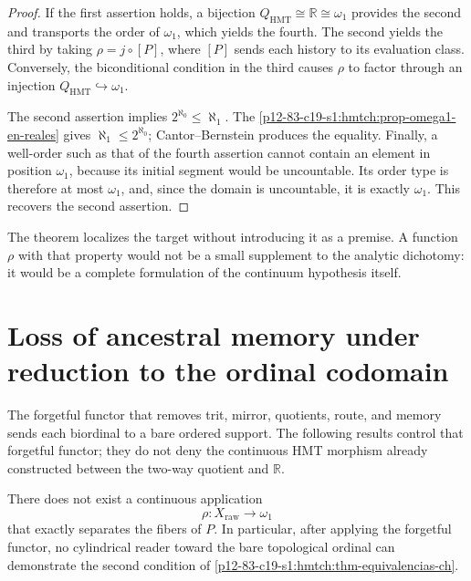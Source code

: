 \begin{proof}
If the first assertion holds, a bijection \(Q_{\mathrm{HMT}}\cong\mathbb R\cong\omega_1\) provides the second and transports the order of \(\omega_1\), which yields the fourth. The second yields the third by taking \(\rho=j\circ[P]\), where \([P]\) sends each history to its evaluation class. Conversely, the biconditional condition in the third causes \(\rho\) to factor through an injection \(Q_{\mathrm{HMT}}\hookrightarrow\omega_1\).

The second assertion implies
\(2^{\aleph_0}\leq\aleph_1\). The
\cref{p12-83-c19-s1:hmtch:prop-omega1-en-reales} gives
\(\aleph_1\leq2^{\aleph_0}\); Cantor--Bernstein produces the equality. Finally,
a well-order such as that of the fourth assertion cannot contain an
element in position \(\omega_1\), because its initial segment would be uncountable.
Its order type is therefore at most \(\omega_1\), and, since
the domain is uncountable, it is exactly \(\omega_1\). This recovers the
second assertion.
\end{proof}

The theorem localizes the target without introducing it as a premise. A function
\(\rho\) with that property would not be a small supplement to the analytic
dichotomy: it would be a complete formulation of the continuum
hypothesis itself.

\section{Loss of ancestral memory under reduction to the ordinal codomain}

The forgetful functor that removes trit, mirror, quotients, route, and memory sends
each biordinal to a bare ordered support. The following results
control that forgetful functor; they do not deny the continuous HMT morphism already
constructed between the two-way quotient and \(\mathbb R\).

\begin{theorem}
\label{p12-83-c19-s1:hmtch:thm-no-go-continuo}
There does not exist a continuous application
\[
 \rho:X_{\mathrm{raw}}\longrightarrow\omega_1
\]
that exactly separates the fibers of \(P\). In particular, after
applying the forgetful functor, no cylindrical reader toward the bare
topological ordinal can demonstrate the second condition of
\cref{p12-83-c19-s1:hmtch:thm-equivalencias-ch}.
\end{theorem}

